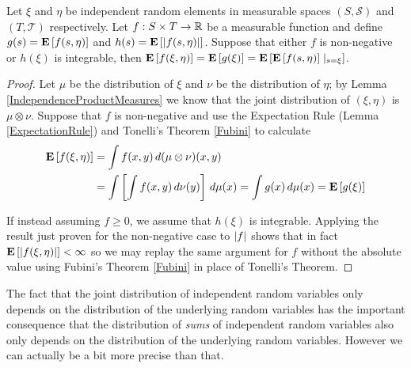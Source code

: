 \begin{lem}\label{DisintegrationIndependentLaws}Let $\xi$ and $\eta$ be
  independent random elements in measurable spaces $(S, \mathcal{S})$
  and $(T, \mathcal{T})$ respectively.  Let $f : S \times T \to
  \mathbb{R}$ be a measurable function and define 
  $g(s) = \textbf{E}\left[f(s, \eta)\right]$ and 
  $h(s) = \textbf{E}\left[\left \vert f(s, \eta) \right \vert\right]$. Suppose that either $f$ is
  non-negative or $h(\xi)$ is integrable, then
$\textbf{E}\left[f(\xi, \eta)\right] = \textbf{E}\left[g(\xi)\right] =
\textbf{E}\left[\textbf{E}\left[f(s, \eta)\right]\mid_{s=\xi}\right] $.
\end{lem}
\begin{proof}
Let $\mu$ be the distribution of $\xi$ and $\nu$ be the distribution
of $\eta$; by Lemma \ref{IndependenceProductMeasures} we know that the
joint distribution of $(\xi, \eta)$ is $\mu \otimes \nu$.  Suppose
that $f$ is non-negative and use the Expectation Rule (Lemma \ref{ExpectationRule}) and
Tonelli's Theorem \ref{Fubini} to calculate
\begin{align*}
\textbf{E}\left[f(\xi, \eta)\right] &= \int f(x,y) \, d(\mu \otimes \nu)(x,y)
\\
&=
\int \left [ \int f(x, y) \, d\nu(y) \right ] \, d\mu(x) = \int g(x)
\, d\mu(x) = \textbf{E}\left[g(\xi)\right]
\end{align*}

If instead assuming $f \geq 0$, we assume that $h(\xi)$ is integrable.
Applying the result just proven for the non-negative case to $\left \vert f \right \vert$
shows that in fact $\textbf{E}\left[ \left \vert f(\xi, \eta) \right \vert\right] < \infty$ so we
may replay the same argument for $f$ without the absolute value using Fubini's Theorem
\ref{Fubini} in place of Tonelli's Theorem.
\end{proof}

The fact that the joint distribution of independent random variables
only depends on the distribution of the underlying random variables
has the important consequence that the distribution of \emph{sums} of
independent random variables also only depends on the distribution of
the underlying random variables.  However we can actually be a bit
more precise than that.

